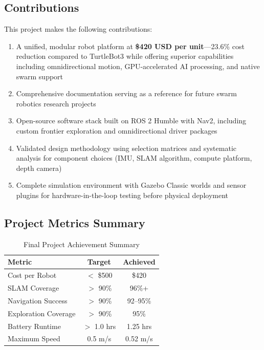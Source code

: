 \subsection{Contributions}
This project makes the following contributions:
\begin{enumerate}
    \item A unified, modular robot platform at \textbf{\$420 USD per unit}---23.6\% cost reduction compared to TurtleBot3 while offering superior capabilities including omnidirectional motion, GPU-accelerated AI processing, and native swarm support
    \item Comprehensive documentation serving as a reference for future swarm robotics research projects
    \item Open-source software stack built on ROS 2 Humble with Nav2, including custom frontier exploration and omnidirectional driver packages
    \item Validated design methodology using selection matrices and systematic analysis for component choices (IMU, SLAM algorithm, compute platform, depth camera)
    \item Complete simulation environment with Gazebo Classic worlds and sensor plugins for hardware-in-the-loop testing before physical deployment
\end{enumerate}

\subsection{Project Metrics Summary}

\begin{table}[H]
\centering
\caption{Final Project Achievement Summary}
\label{tab:conclusion_metrics}
\begin{tabular}{|l|c|c|}
\hline
\textbf{Metric} & \textbf{Target} & \textbf{Achieved} \\
\hline
Cost per Robot & $<$ \$500 & \$420 \\
SLAM Coverage & $>$ 90\% & 96\%+ \\
Navigation Success & $>$ 90\% & 92--95\% \\
Exploration Coverage & $>$ 90\% & 95\% \\
Battery Runtime & $>$ 1.0 hrs & 1.25 hrs \\
Maximum Speed & 0.5 m/s & 0.52 m/s \\

\hline
\end{tabular}
\end{table}

